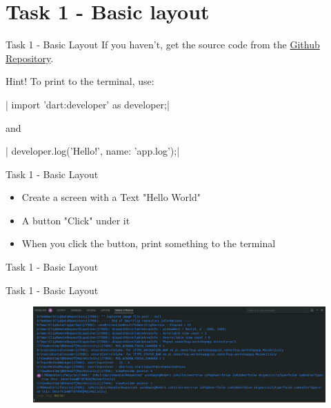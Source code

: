 \section{Task 1 - Basic layout}

\begin{frame}{Task 1 - Basic Layout}
    If you haven't, get the source code from the \href{https://github.com/NEEECFEUP/WS-App-Development/}{Github Repository}.

    \begin{block}{Hint!}
        To print to the terminal, use:
        
        | import 'dart:developer' as developer;|

        and

        | developer.log('Hello!', name: 'app.log');|
    \end{block}
\end{frame}

\begin{frame}{Task 1 - Basic Layout}
    \begin{itemize}
        \item Create a screen with a Text "Hello World"
        \item A button "Click" under it
        \item When you click the button, print something to the terminal
    \end{itemize}
\end{frame}

\begin{frame}{Task 1 - Basic Layout}
    \begin{figure}[h]
        {
            \setlength{\fboxsep}{0pt}%
            \setlength{\fboxrule}{0.5pt}%
        }
    \end{figure}
\end{frame}

\begin{frame}{Task 1 - Basic Layout}
    \begin{figure}[h]
        \includegraphics[width=1\textwidth]{images/task1-term.png}
    \end{figure}
\end{frame}